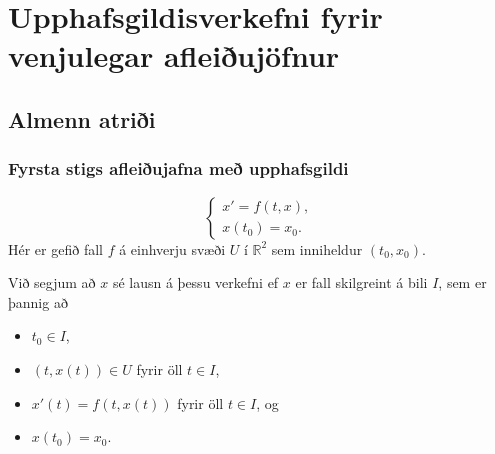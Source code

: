 \documentclass[icelandic,a4paper,12pt]{article}
\begin{document}
\section{Upphafsgildisverkefni fyrir venjulegar afleiðujöfnur}



\subsection{Almenn atriði} 
\subsubsection{Fyrsta stigs afleiðujafna með upphafsgildi}
\begin{equation*}
\begin{cases}
x' = f(t,x),\\
x(t_0) = x_0.
\end{cases}
\end{equation*}
Hér er gefið fall $f$ á einhverju svæði $U$ í $\mathbb{R}^2$ sem
inniheldur $(t_0,x_0)$. 

\pause
\smallskip
Við segjum að $x$ sé lausn á þessu verkefni ef
$x$ er fall skilgreint á bili $I$, sem er þannig að \pause
\begin{itemize}
 \item $t_0 \in I$, \pause
 \item $(t,x(t)) \in U$ fyrir öll $t \in I$, \pause
 \item $x'(t) = f(t,x(t))$ fyrir öll $t \in I$, og\pause
 \item $x(t_0) = x_0$.
\end{itemize}
\end{document}
